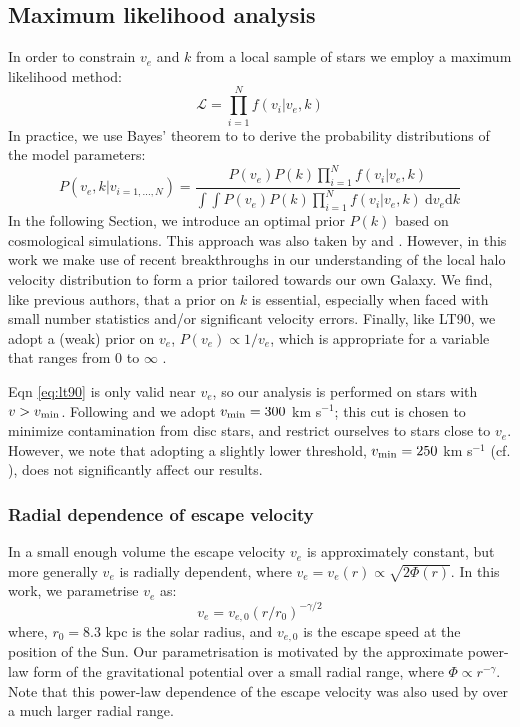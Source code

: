 \documentclass[fleqn,usenatbib]{mnras}
\begin{document}
\subsection{Maximum likelihood analysis}
In order to constrain $v_e$ and $k$ from a local sample of stars we employ a maximum likelihood method:
\begin{equation}
\mathcal{L} = \prod_{i=1}^{N} f(v_i | v_e, k)
\end{equation}
In practice, we use Bayes' theorem to to derive the probability distributions of the model parameters:
\begin{equation}
P(v_e,k | v_{i=1,...,N}) = \frac{P(v_e)P(k)\prod_{i=1}^{N} f(v_i | v_e,k)}{\int\int P(v_e)P(k)\prod_{i=1}^{N} f(v_i | v_e,k)~\mathrm{d}v_e \mathrm{d} k}
\end{equation}
In the following Section, we introduce an optimal prior $P(k)$ based on cosmological simulations. This approach was also taken by \cite{smith07} and \cite{piffl14}. However, in this work we make use of recent breakthroughs in our understanding of the local halo velocity distribution to form a prior tailored towards our own Galaxy. We find, like previous authors,  that a prior  on $k$ is essential, especially when faced with small number statistics and/or significant velocity errors. Finally, like LT90, we adopt a (weak) prior on $v_e$, $P(v_e) \propto 1/v_e$, which is appropriate for a variable that ranges from $0$ to $\infty$ \citep{kendall77}.

Eqn \ref{eq:lt90} is only valid near $v_e$, so our analysis is performed on stars with $v > v_{\rm min}$. Following \cite{kochanek96} and \cite{smith07} we adopt $v_{\rm min} = 300$ km s$^{-1}$; this cut is chosen to minimize contamination from disc stars, and restrict ourselves to stars close to $v_e$. However, we note that adopting a slightly lower threshold, $v_{\rm min} = 250$ km s$^{-1}$ (cf. \citealt{monari18}), does not significantly affect our results.
\subsubsection{Radial dependence of escape velocity}
In a small enough volume the escape velocity $v_e$ is approximately constant, but more generally $v_e$ is radially dependent, where $v_e=v_e(r) \propto \sqrt{2\Phi(r)}$. In this work, we parametrise $v_e$ as:
 \begin{equation}
 v_e = v_{e,0} \left(r/r_0\right)^{-\gamma/2}
 \end{equation}
where, $r_0=8.3$ kpc is the solar radius, and $v_{e,0}$ is the escape speed at the position of the Sun. Our parametrisation is motivated by the approximate power-law form of the gravitational potential over a small radial range, where $\Phi \propto r^{-\gamma}$. Note that this power-law dependence of the escape velocity was also used by \cite{williams17} over a much larger radial range.
\end{document}
